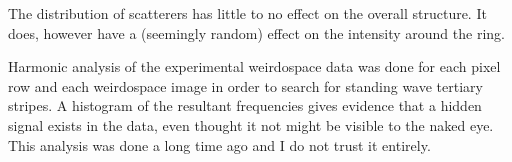 The distribution of scatterers has little to no effect on the overall
structure.  It does, however have a (seemingly random) effect on the
intensity around the ring.

Harmonic analysis of the experimental weirdospace data was done for each
pixel row and each weirdospace image in order to search for standing wave
tertiary stripes.  A histogram of the resultant frequencies gives evidence
that a hidden signal exists in the data, even thought it not might be
visible to the naked eye.  This analysis was done a long time ago and I do
not trust it entirely.
